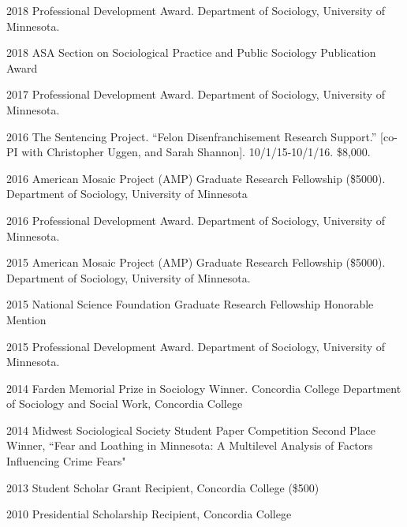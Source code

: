\documentclass[letterpaper]{article}
\renewenvironment{itemize}{
  \begin{list}{}{
    \setlength{\leftmargin}{1.5em}
  }
}{
  \end{list}
}
\begin{document}
\begin{itemize}
\item 2018 Professional Development Award. Department of Sociology, University of Minnesota. 
\item 2018 ASA Section on Sociological Practice and Public Sociology Publication Award
\item 2017 Professional Development Award. Department of Sociology, University of Minnesota. 
\item 2016 The Sentencing Project. “Felon Disenfranchisement Research Support.” [co-PI with Christopher Uggen, and Sarah Shannon]. 10/1/15-10/1/16. \$8,000.
\item 2016 American Mosaic Project (AMP) Graduate Research Fellowship (\$5000). Department of Sociology, University of Minnesota
\item 2016 Professional Development Award. Department of Sociology, University of Minnesota. 
\item 2015 American Mosaic Project (AMP) Graduate Research Fellowship (\$5000). Department of Sociology, University of Minnesota. 
\item 2015 National Science Foundation Graduate Research Fellowship Honorable Mention
\item 2015 Professional Development Award. Department of Sociology, University of Minnesota. 
\item 2014 Farden Memorial Prize in Sociology Winner. Concordia College Department of Sociology and Social Work, Concordia College
\item 2014 Midwest Sociological Society Student Paper Competition Second Place Winner,  ``Fear and Loathing in Minnesota: A Multilevel Analysis of Factors Influencing Crime Fears"
\item 2013 Student Scholar Grant Recipient, Concordia College (\$500)
\item 2010 Presidential Scholarship Recipient, Concordia College

\end{itemize}
\end{document}
